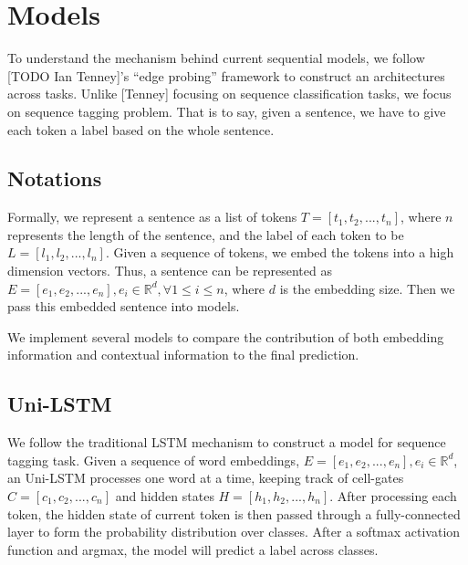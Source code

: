 \documentclass{article}
\newcommand{\red}[1]{\textcolor{red}{#1}}
\begin{document}

\section{Models}

To understand the mechanism behind current sequential models, we follow [TODO Ian Tenney]'s ``edge probing'' framework to construct an architectures across tasks. Unlike [Tenney] focusing on sequence classification tasks, we focus on sequence tagging problem. That is to say, given a sentence, we have to give each token a label based on the whole sentence.

\subsection{Notations}
Formally, we represent a sentence as a list of tokens $T = [t_1, t_2, ... , t_n]$, where $n$ represents the length of the sentence, and the label of each token to be $L = [l_1, l_2, ... , l_n]$. Given a sequence of tokens, we embed the tokens into a high dimension vectors. Thus, a sentence can be represented as $E = [e_1, e_2, ... , e_n], e_i \in \mathbb{R}^d, \forall 1 \leq i \leq n$, where $d$ is the embedding size. Then we pass this embedded sentence into models.



We implement several models to compare the contribution of both embedding information and contextual information to the final prediction. 


\subsection{Uni-LSTM}

We follow the traditional LSTM mechanism to construct a model for sequence tagging task. Given a sequence of word embeddings, $E = [e_1, e_2, ... , e_n], e_i \in \mathbb{R}^d$, an Uni-LSTM processes one word at a time, keeping track of cell-gates $C = [c_1, c_2, ... , c_n]$ and hidden states $H = [h_1, h_2, ... , h_n]$. After processing each token, the hidden state of current token is then passed through a fully-connected layer to form the probability distribution over classes. After a softmax activation function and argmax, the model will predict a label across classes.
\end{document}
